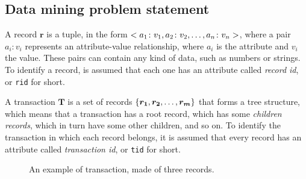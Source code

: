 \documentclass{acm_proc_article-sp-sigmod09}
\begin{document}
\subsection{Data mining problem statement}
A record $\boldsymbol{r}$ is a tuple, in the form $<a_1 \colon v_1, a_2 \colon v_2, \text{\dots}, a_n \colon v_n>$, where a pair $a_i \colon v_i$ represents an attribute-value relationship, where $a_i$ is the attribute and $v_i$ the value. These pairs can contain any kind of data, such as numbers or strings. To identify a record, is assumed that each one has an attribute called \emph{record id}, or \texttt{rid} for short.

A transaction $\boldsymbol{T}$ is a set of records $\{\boldsymbol{r_1}, \boldsymbol{r_2}, \text{\dots}, \boldsymbol{r_m}\}$ that forms a tree structure, which means that a transaction has a root record, which has some \emph{children records}, which in turn have some other children, and so on. To identify the transaction in which each record belongs, it is assumed that every record has an attribute called \emph{transaction id}, or \texttt{tid} for short.

\begin{figure}
\centering
{}
\caption{An example of transaction, made of three records.}
\label{fig:transaction}
\end{figure}
\end{document}
